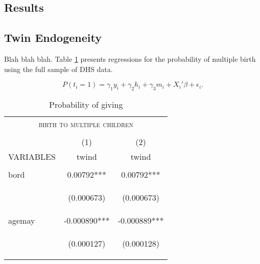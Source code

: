 \documentclass{article}[11pt,subeqn]
\begin{document}
\begin{spacing}{1.25}
  
\section{Results}
\label{scn:results}
\subsection{Twin Endogeneity}
\label{scn:twinendog}
Blah blah blah.  Table \ref{tab:twinreg1} presents regressions for the probability of multiple birth using the full sample of DHS data.

\begin{equation}
\label{eqn:twinpred}
P(t_i=1)=\gamma_1 y_i + \gamma_2 h_i + \gamma_3 m_i +X_i'\beta + \epsilon_i.
\end{equation}

\begin{table}[ht]
\caption{Probability of giving}
\vspace{-7mm}
\label{tab:twinreg1}
\begin{center}
\begin{tabular}{lcc} 
\multicolumn{3}{c}{\textsc{birth to multiple children}}\\
& & \\
\toprule
 & (1) & (2) \\
VARIABLES & twind & twind \\ \midrule
\vspace{4pt} & \begin{footnotesize}\end{footnotesize} & \begin{footnotesize}\end{footnotesize} \\
bord & 0.00792*** & 0.00792*** \\
\vspace{4pt} & \begin{footnotesize}(0.000673)\end{footnotesize} & \begin{footnotesize}(0.000673)\end{footnotesize} \\
agemay & -0.000890*** & -0.000889*** \\
\vspace{4pt} & \begin{footnotesize}(0.000127)\end{footnotesize} & \begin{footnotesize}(0.000128)\end{footnotesize} \\

\end{tabular}
\end{center}
\end{table}
\end{spacing}
\end{document}

